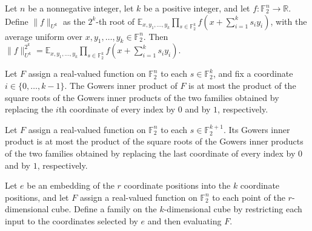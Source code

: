 \begin{theorem}
\label{FABL.gowersNorm_pow}
\leanok
{}
Let $n$ be a nonnegative integer, let $k$ be a positive integer, and let $f\colon\mathbb
F_2^n\to\mathbb R$. Define $\|f\|_{U^k}$ as the $2^k$-th root of $\mathbb
E_{x,y_1,\ldots,y_k}\prod_{s\in\mathbb F_2^k}f(x+\sum_{i=1}^k s_i y_i)$, with the
average uniform over $x,y_1,\ldots,y_k\in\mathbb F_2^n$. Then $\|f\|_{U^k}^{2^k}=\mathbb
E_{x,y_1,\ldots,y_k}\prod_{s\in\mathbb F_2^k}f(x+\sum_{i=1}^k s_i y_i)$.
\end{theorem}

\begin{theorem}
\label{FABL.gowers_cauchy_schwarz_at}
\leanok
{}
Let $F$ assign a real-valued function on $\mathbb{F}_2^n$ to each $s\in\mathbb{F}_2^k$,
and fix a coordinate $i\in\{0,\ldots,k-1\}$. The Gowers inner product of $F$ is at most
the product of the square roots of the Gowers inner products of the two families
obtained by replacing the $i$th coordinate of every index by $0$ and by $1$,
respectively.
\end{theorem}

\begin{theorem}
\label{FABL.gowers_cauchy_schwarz_last}
\leanok
{}
Let $F$ assign a real-valued function on $\mathbb{F}_2^n$ to each
$s\in\mathbb{F}_2^{k+1}$. Its Gowers inner product is at most the product of the square
roots of the Gowers inner products of the two families obtained by replacing the last
coordinate of every index by $0$ and by $1$, respectively.
\end{theorem}

\begin{definition}
\label{FABL.gowersLiftFamilyAlong}
\leanok
{}
Let $e$ be an embedding of the $r$ coordinate positions into the $k$ coordinate
positions, and let $F$ assign a real-valued function on $\mathbb F_2^n$ to each point of
the $r$-dimensional cube. Define a family on the $k$-dimensional cube by restricting
each input to the coordinates selected by $e$ and then evaluating $F$.
\end{definition}

